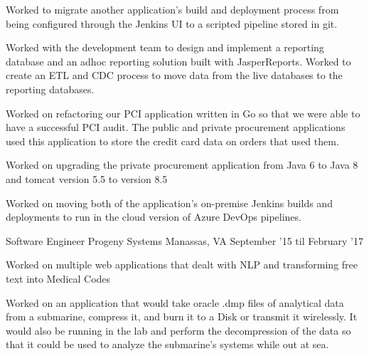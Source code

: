 \begin{cventries}
{\begin{cvitems}
        \item {Worked to migrate another application's build and deployment process from being configured 
            through the Jenkins UI to a scripted pipeline stored in git.}
        \item {Worked with the development team to design and implement a reporting database and an adhoc reporting solution built with JasperReports.
            Worked to create an ETL and CDC process to move data from the live databases to the reporting databases.}
        \item {Worked on refactoring our PCI application written in Go so that we were able to have a successful PCI audit.
            The public and private procurement applications used this application to store the credit card data on orders that used them.}
        \item {Worked on upgrading the private procurement application from Java 6 to Java 8 and tomcat version 5.5 to version 8.5}
        \item {Worked on moving both of the application's on-premise Jenkins builds and deployments to run in the cloud version of Azure DevOps pipelines.}
        \end{cvitems}
    }

    \cventry
    {Software Engineer} %
    {Progeny Systems} %
    {Manassas, VA} %
    {September '15 til February '17} %
    {
        \begin{cvitems} %
        \item {Worked on multiple web applications that dealt with NLP and transforming free text into Medical Codes}
        \item {Worked on an application that would take oracle .dmp files of analytical data from a submarine,
            compress it, and burn it to a Disk or transmit it wirelessly. It would also be running in the lab 
            and perform the decompression of the data so that it could be used to analyze the submarine's systems while out at sea.}
        \end{cvitems}
    }
\end{cventries}
